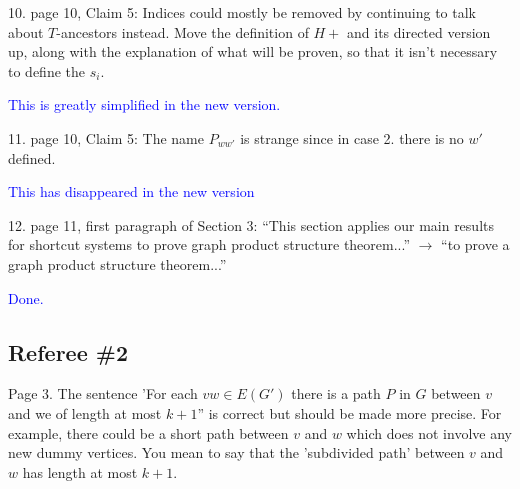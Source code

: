 \documentclass[12pt]{article}
\newcommand{\done}{\textcolor{blue}{Done.}}
\begin{document}
10. page 10, Claim 5: Indices could mostly be removed by continuing
to talk about $T$-ancestors instead. Move the definition of $H+$ and its
directed version up, along with the explanation of what will be proven,
so that it isn’t necessary to define the $s_i$.

\textcolor{blue}{This is greatly simplified in the new version.}

11. page 10, Claim 5: The name $P_{ww'}$ is strange since in case 2. there is
no $w'$ defined.

\textcolor{blue}{This has disappeared in the new version}

12. page 11, first paragraph of Section 3: ``This section applies our main results for shortcut systems to prove graph product structure theorem...'' $\longrightarrow$ ``to prove a graph product structure theorem...''

\done

\subsection*{Referee \#2}

%
%


Page 3.  The sentence 'For each $vw \in E(G')$ there is a path $P$ in $G$
between $v$ and we of length at most $k+1$'' is correct but should be made
more precise.  For example, there could be a short path between $v$ and
$w$ which does not involve any new dummy vertices.  You mean to say that
the 'subdivided path' between $v$ and $w$ has length at most $k+1$.
\end{document}
